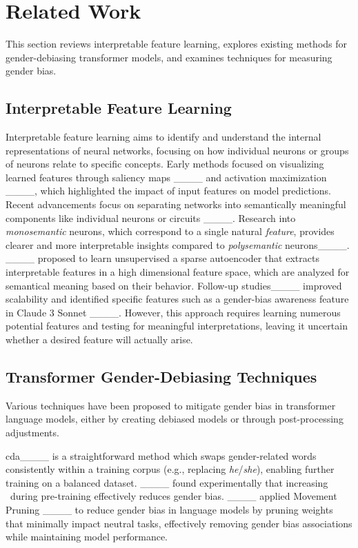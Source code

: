 \section{Related Work}
\label{sec:rel-work}
This section reviews interpretable feature learning, explores existing methods for gender-debiasing transformer models, and examines techniques for measuring gender bias.

\subsection{Interpretable Feature Learning}

Interpretable feature learning aims to identify and understand the internal representations of neural networks, focusing on how individual neurons or groups of neurons relate to specific concepts.
Early methods focused on visualizing learned features through saliency maps ____ and activation maximization ____, which highlighted the impact of input features on model predictions.
Recent advancements focus on separating networks into semantically meaningful components like individual neurons or circuits ____.
Research into \emph{monosemantic} neurons, which correspond to a single natural \emph{feature}, provides clearer and more interpretable insights compared to \emph{polysemantic} neurons____.
____ proposed to learn unsupervised a sparse autoencoder that extracts interpretable features in a high dimensional feature space, which are analyzed for semantical meaning based on their behavior. Follow-up studies____ improved scalability and identified  specific features such as a gender-bias awareness feature in Claude 3 Sonnet ____. 
However, this approach requires learning numerous potential features and testing for meaningful interpretations, leaving it uncertain whether a desired feature will actually arise.


\subsection{Transformer Gender-Debiasing Techniques}\label{sec:rel-work-debiasing}

Various techniques have been proposed to mitigate gender bias in transformer language models, either by creating debiased models or through post-processing adjustments.

\gls{cda}____ %
is a straightforward method which swaps gender-related words consistently within a training corpus (e.g., replacing \emph{he}/\emph{she}), enabling further training on a balanced dataset. %
____ found experimentally that increasing \dropout\ during pre-training effectively reduces gender bias.
____ applied Movement Pruning ____ to reduce gender bias in language models by pruning weights that minimally impact neutral tasks, effectively removing gender bias associations while maintaining model performance.

